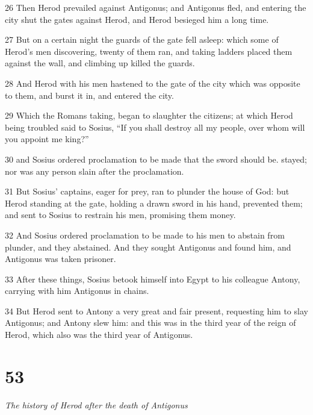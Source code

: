 \par 26 Then Herod prevailed against Antigonus; and Antigonus fled, and entering the city shut the gates against Herod, and Herod besieged him a long time. 

\par 27 But on a certain night the guards of the gate fell asleep: which some of Herod’s men discovering, twenty of them ran, and taking ladders placed them against the wall, and climbing up killed the guards. 

\par 28 And Herod with his men hastened to the gate of the city which was opposite to them, and burst it in, and entered the city. 

\par 29 Which the Romans taking, began to slaughter the citizens; at which Herod being troubled said to Sosius, “If you shall destroy all my people, over whom will you appoint me king?” 

\par 30 and Sosius ordered proclamation to be made that the sword should be. stayed; nor was any person slain after the proclamation. 

\par 31 But Sosius’ captains, eager for prey, ran to plunder the house of God: but Herod standing at the gate, holding a drawn sword in his hand, prevented them; and sent to Sosius to restrain his men, promising them money. 

\par 32 And Sosius ordered proclamation to be made to his men to abstain from plunder, and they abstained. And they sought Antigonus and found him, and Antigonus was taken prisoner. 

\par 33 After these things, Sosius betook himself into Egypt to his colleague Antony, carrying with him Antigonus in chains. 

\par 34 But Herod sent to Antony a very great and fair present, requesting him to slay Antigonus; and Antony slew him: and this was in the third year of the reign of Herod, which also was the third year of Antigonus. 

\chapter{53}

\par \textit{The history of Herod after the death of Antigonus}

